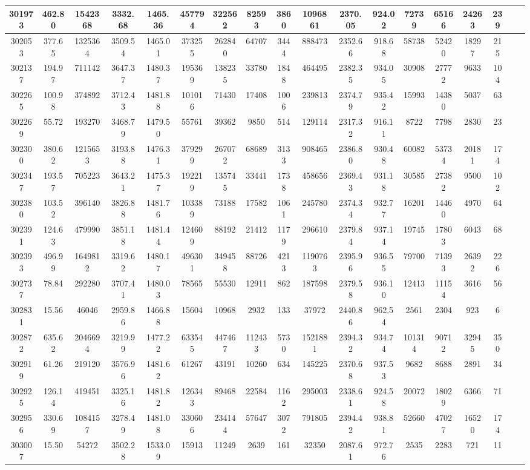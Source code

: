 \documentclass[10pt]{extarticle}
\begin{document}
\begin{longtable}{|c|c|c|c|c|c|c|c|c|c|c|c|c|c|c|c|c|c|}
\hline 
301973&462.80&1542368&3332.68&1465.36&457794&322562&82593&3860&1096861&2370.05&924.02&72739&65166&24263&239 \\ 
\hline 
302053&377.65&1325364&3509.54&1465.01&373255&262840&64707&3444&888473&2352.66&918.68&58738&52420&18297&215 \\ 
\hline 
302137&194.97&711142&3647.37&1480.37&195369&138235&33780&1848&464495&2382.35&934.05&30908&27772&9633&104 \\ 
\hline 
302265&100.98&374892&3712.43&1481.88&101016&71430&17408&1006&239813&2374.79&935.42&15993&14380&5037&63 \\ 
\hline 
302269&55.72&193270&3468.79&1479.50&55761&39362&9850&514&129114&2317.32&916.11&8722&7798&2830&23 \\ 
\hline 
302300&380.62&1215653&3193.88&1476.31&379299&267072&68689&3133&908465&2386.80&930.48&60082&53734&20181&174 \\ 
\hline 
302347&193.57&705223&3643.21&1475.37&192219&135745&33441&1738&458656&2369.43&931.18&30585&27382&9500&102 \\ 
\hline 
302380&103.52&396140&3826.88&1481.76&103389&73188&17582&1061&245780&2374.34&932.77&16201&14460&4970&64 \\ 
\hline 
302391&124.63&479990&3851.18&1481.44&124609&88192&21412&1179&296610&2379.84&937.14&19745&17803&6043&68 \\ 
\hline 
302393&496.99&1649812&3319.62&1480.17&496301&349458&88726&4213&1190763&2395.96&936.55&79700&71393&26392&226 \\ 
\hline 
302737&78.84&292280&3707.41&1480.03&78565&55530&12911&862&187598&2379.58&936.10&12413&11154&3616&56 \\ 
\hline 
302831&15.56&46046&2959.86&1466.88&15604&10968&2932&133&37972&2440.86&962.54&2561&2304&923&6 \\ 
\hline 
302872&635.62&2046694&3219.99&1477.22&633545&447467&112433&5730&1521881&2394.32&934.74&101314&90712&32945&350 \\ 
\hline 
302919&61.26&219120&3576.96&1481.62&61267&43191&10260&634&145225&2370.68&937.53&9682&8688&2891&34 \\ 
\hline 
302925&126.14&419451&3325.16&1481.82&126343&89468&22584&1162&295003&2338.61&924.58&20072&18029&6366&71 \\ 
\hline 
302956&330.69&1084157&3278.49&1481.08&330606&234144&57647&3072&791805&2394.42&938.81&52660&47027&16520&174 \\ 
\hline 
303007&15.50&54272&3502.28&1533.09&15913&11249&2639&161&32350&2087.61&972.76&2535&2283&721&11 \\ 

\end{longtable}
\end{document}
